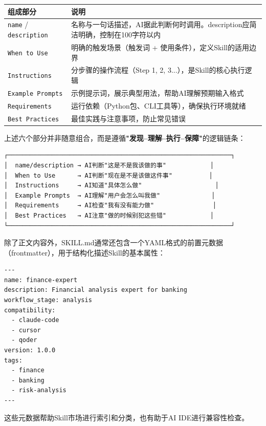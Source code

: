 \begin{table}[H]
\centering
\begin{tabular}{lp{9cm}}
\toprule
\textbf{组成部分} & \textbf{说明} \\
\midrule
\texttt{name} / \texttt{description} & 名称与一句话描述，AI据此判断何时调用。description应简洁明确，控制在100字符以内 \\
\texttt{When to Use} & 明确的触发场景（触发词 + 使用条件），定义Skill的适用边界 \\
\texttt{Instructions} & 分步骤的操作流程（Step 1, 2, 3...），是Skill的核心执行逻辑 \\
\texttt{Example Prompts} & 示例提示词，展示典型用法，帮助AI理解预期输入格式 \\
\texttt{Requirements} & 运行依赖（Python包、CLI工具等），确保执行环境就绪 \\
\texttt{Best Practices} & 最佳实践与注意事项，防止常见错误 \\
\bottomrule
\end{tabular}
\end{table}

上述六个部分并非随意组合，而是遵循\textbf{"发现--理解--执行--保障"}的逻辑链条：

\begin{verbatim}
┌─────────────────────────────────────────────────────────────┐
│  name/description → AI判断"这是不是我该做的事"            │
│  When to Use      → AI判断"现在是不是该做这件事"          │
│  Instructions     → AI知道"具体怎么做"                    │
│  Example Prompts  → AI理解"用户会怎么叫我做"              │
│  Requirements     → AI检查"我有没有能力做"                │
│  Best Practices   → AI注意"做的时候别犯这些错"            │
└─────────────────────────────────────────────────────────────┘
\end{verbatim}

\begin{notebox}
除了正文内容外，SKILL.md通常还包含一个YAML格式的前置元数据（frontmatter），用于结构化描述Skill的基本属性：
\begin{lstlisting}[style=json]
---
name: finance-expert
description: Financial analysis expert for banking
workflow_stage: analysis
compatibility:
  - claude-code
  - cursor
  - qoder
version: 1.0.0
tags:
  - finance
  - banking
  - risk-analysis
---
\end{lstlisting}
这些元数据帮助Skill市场进行索引和分类，也有助于AI IDE进行兼容性检查。
\end{notebox}

